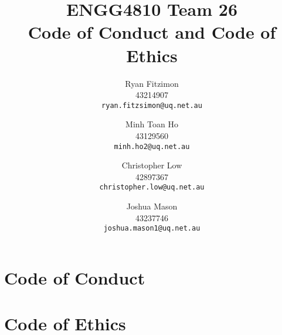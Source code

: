 \documentclass[a4paper]{article}
\title{ENGG4810 Team 26\\
	Code of Conduct and Code of Ethics}
\author{
	Ryan Fitzimon\\
	43214907\\
	\texttt{ryan.fitzsimon@uq.net.au}
	\and
	Minh Toan Ho\\
	43129560\\
	\texttt{minh.ho2@uq.net.au}
	\and
	Christopher Low\\
	42897367\\
	\texttt{christopher.low@uq.net.au}
	\and
	Joshua Mason\\
	43237746\\
	\texttt{joshua.mason1@uq.net.au}
}
\begin{document}
\maketitle

\section{Code of Conduct}

\section{Code of Ethics}
\end{document}
